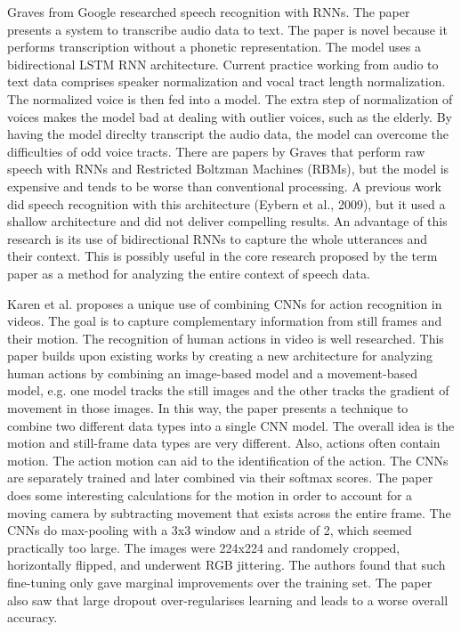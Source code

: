 Graves from Google researched speech recognition with RNNs.  The paper presents a system to transcribe audio data to text.  The paper is novel because it performs transcription without a phonetic representation.  The model uses a bidirectional LSTM RNN architecture.  Current practice working from audio to text data comprises speaker normalization and vocal tract length normalization.  The normalized voice is then fed into a model.  The extra step of normalization of voices makes the model bad at dealing with outlier voices, such as the elderly.  By having the model direclty transcript the audio data, the model can overcome the difficulties of odd voice tracts.  There are papers by Graves that perform raw speech with RNNs and Restricted Boltzman Machines (RBMs), but the model is expensive and tends to be worse than conventional processing.  A previous work did speech recognition with this architecture (Eybern et al., 2009), but it used a shallow architecture and did not deliver compelling results. An advantage of this research is its use of bidirectional RNNs to capture the whole utterances and their context.  This is possibly useful in the core research proposed by the term paper as a method for analyzing the entire context of speech data.

Karen et al. proposes a unique use of combining CNNs for action recognition in videos.  The goal is to capture complementary information from still frames and their motion. The recognition of human actions in video is well researched.  This paper builds upon existing works by creating a new architecture for analyzing human actions by combining an image-based model and a movement-based model, e.g. one model tracks the still images and the other tracks the gradient of movement in those images.  In this way, the paper presents a technique to combine two different data types into a single CNN model.  The overall idea is the motion and still-frame data types are very different. Also, actions often contain motion.  The action motion can aid to the identification of the action.  The CNNs are separately trained and later combined via their softmax scores.  The paper does some interesting calculations for the motion in order to account for a moving camera by subtracting movement that exists across the entire frame.  The CNNs do max-pooling with a 3x3 window and a stride of 2, which seemed practically too large.  The images were 224x224 and randomely cropped, horizontally flipped, and underwent RGB jittering.  The authors found that such fine-tuning only gave marginal improvements over the training set.  The paper also saw that large dropout over-regularises learning and leads to a worse overall accuracy.  
